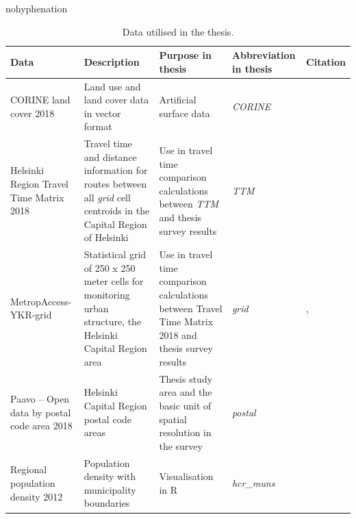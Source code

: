 \begin{hyphenrules}{nohyphenation}
    \begin{table}[H]
        \centering
        \caption[Thesis data]{Data utilised in the thesis.} 
        \label{tab:used_data}
        \scalebox{0.8}
        {\def\arraystretch{1.5} 
        \setlength\tabcolsep{1.2ex}
        \begin{tabular}{ @{} >{\raggedright\arraybackslash}p{4cm} >{\raggedright\arraybackslash}p{4cm} >{\raggedright\arraybackslash}p{4.5cm} >{\raggedright\arraybackslash}p{3.5cm} >{\raggedleft\arraybackslash}p{3.5cm} @{} }
            \toprule
            Data & Description & Purpose in thesis & Abbreviation in thesis & Citation \\
            \midrule
            CORINE land cover 2018 & Land use and land cover data in vector format & Artificial surface data & \textit{CORINE} & \cite{FinnishEnvironmentInstitute2018} \\
            Helsinki Region Travel Time Matrix 2018 & Travel time and distance information for routes between all \textit{grid} cell centroids in the Capital Region of Helsinki & Use in travel time comparison calculations between \textit{TTM} and thesis survey results & \textit{TTM} & \cite{Tenkanen2018} \\
            MetropAccess-YKR-grid & Statistical grid of 250 x 250 meter cells for monitoring urban structure, the Helsinki Capital Region area & Use in travel time comparison calculations between Travel Time Matrix 2018 and thesis survey results & \textit{grid} & \cite{Toivonen2014a}, \cite{StatisticsFinland2020} \\
            Paavo -- Open data by postal code area 2018 & Helsinki Capital Region postal code areas & Thesis study area and the basic unit of spatial resolution in the survey & \textit{postal} & \cite{StatisticsFinland2019a} \\
            Regional population density 2012 & Population density with municipality boundaries & Visualisation in R & \textit{hcr\_muns} & \cite{StatisticsFinland2012} \\

\end{tabular}}
\end{table}
\end{hyphenrules}
